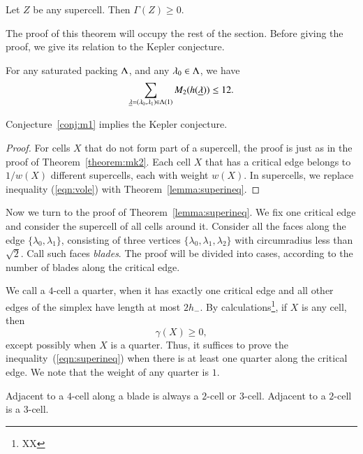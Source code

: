 \begin{theorem}\label{lemma:superineq} 
Let $Z$ be any supercell.  Then $\Gamma(Z)\ge 0$.
\end{theorem}

The proof of this theorem will occupy the rest of the section.  Before giving the proof, we give its relation to the Kepler conjecture.


\begin{conjecture}\label{conj:m2} For any saturated packing $\Lambda$, and
any $\lambda_0\in\Lambda$, we have
\begin{equation}\label{eqn:M12}
\sum_{{\underline{\lambda}}=(\lambda_0,\lambda_1)\in\Lambda(1)} M_2(h({\underline{\lambda}})) \le 12.
\end{equation}
\end{conjecture}

\begin{theorem}\label{theorem:mk2}
Conjecture~\ref{conj:m1} implies the Kepler conjecture.
\end{theorem}

\begin{proof}  For cells $X$ that do not form part of a supercell,
the proof is just as in the proof of Theorem~\ref{theorem:mk2}.
Each cell $X$ that has a critical edge belongs to $1/w(X)$ different
supercells, each with weight $w(X)$.  In supercells, we replace inequality
(\ref{eqn:vole}) with Theorem~\ref{lemma:superineq}.
\end{proof}

Now we turn to the proof of Theorem~\ref{lemma:superineq}.
We fix one critical edge and consider the supercell of all cells around it.  Consider all the faces along the edge $\{\lambda_0,\lambda_1\}$, consisting of three vertices $\{\lambda_0,\lambda_1,\lambda_2\}$ with circumradius less than $\sqrt2$.  Call such faces {\it blades}.  The proof will be divided into cases, according to the number of blades along the critical edge.

We call a $4$-cell a quarter, when it has exactly one
critical edge and all other edges of the simplex have length
at most $2 h_-$.
By calculations\footnote{XX}, if $X$ is any cell, then
$$
 \gamma(X) \ge 0,
$$ 
except possibly when $X$ is a quarter.  Thus, it
suffices to prove the inequality~(\ref{eqn:superineq})
when there is at least one quarter along the critical
edge.  We note that the weight of any quarter is $1$.

Adjacent to a $4$-cell along a blade is always a $2$-cell or $3$-cell.
Adjacent to a $2$-cell is a $3$-cell.

